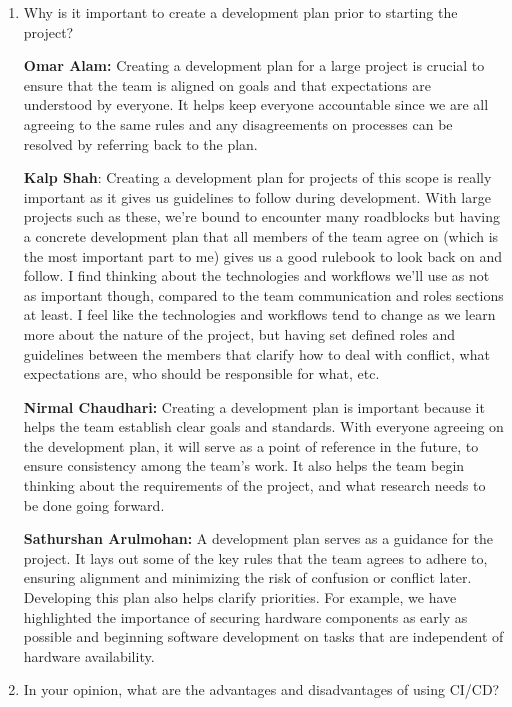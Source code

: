 \documentclass{article}
\begin{document}
\begin{enumerate}
    \item Why is it important to create a development plan prior to starting the
    project?

    \textbf{Omar Alam:} Creating a development plan for a large project is crucial to ensure that the team is aligned on goals
    and that expectations are understood by everyone. It helps keep everyone accountable since we are all agreeing to the same rules
    and any disagreements on processes can be resolved by referring back to the plan.

    \textbf{Kalp Shah}: Creating a development plan for projects of this scope is really important as it gives us guidelines to follow
    during development. With large projects such as these, we're bound to encounter many roadblocks but having a concrete development 
    plan that all members of the team agree on (which is the most important part to me) gives us a good rulebook to look back on and 
    follow. I find thinking about the technologies and workflows we'll use as not as important though, compared to the team communication 
    and roles sections at least. I feel like the technologies and workflows tend to change as we learn more about the nature of the 
    project, but having set defined roles and guidelines between the members that clarify how to deal with conflict, what expectations 
    are, who should be responsible for what, etc. 
    
    \textbf{Nirmal Chaudhari:} Creating a development plan is important because it helps the team establish clear goals and standards. 
    With everyone agreeing on the development plan, it will serve as a point of reference in the future, to ensure consistency among the team's work. 
    It also helps the team begin thinking about the requirements of the project, and what research needs to be done going forward. 

    \textbf{Sathurshan Arulmohan:} A development plan serves as a guidance for the project.
    It lays out some of the key rules that the team agrees to adhere to, ensuring alignment and minimizing the risk of confusion or conflict later.
    Developing this plan also helps clarify priorities.
    For example, we have highlighted the importance of securing hardware components as early as possible and beginning software development on tasks that are independent of hardware availability.

    \item In your opinion, what are the advantages and disadvantages of using
    CI/CD?


\end{enumerate}
\end{document}
